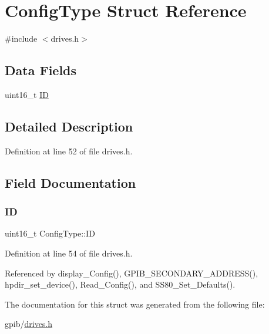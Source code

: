 \hypertarget{structConfigType}{}\section{Config\+Type Struct Reference}
\label{structConfigType}


{\ttfamily \#include $<$drives.\+h$>$}

\subsection*{Data Fields}
\begin{DoxyCompactItemize}
\item 
uint16\+\_\+t \hyperlink{structConfigType_a7d89346361dc0f06db0917c7ff37501a}{ID}
\end{DoxyCompactItemize}


\subsection{Detailed Description}


Definition at line 52 of file drives.\+h.



\subsection{Field Documentation}
\mbox{\label{structConfigType_a7d89346361dc0f06db0917c7ff37501a}} 
\subsubsection{\texorpdfstring{ID}{ID}}
{\footnotesize\ttfamily uint16\+\_\+t Config\+Type\+::\+ID}



Definition at line 54 of file drives.\+h.



Referenced by display\+\_\+\+Config(), G\+P\+I\+B\+\_\+\+S\+E\+C\+O\+N\+D\+A\+R\+Y\+\_\+\+A\+D\+D\+R\+E\+S\+S(), hpdir\+\_\+set\+\_\+device(), Read\+\_\+\+Config(), and S\+S80\+\_\+\+Set\+\_\+\+Defaults().



The documentation for this struct was generated from the following file\+:\begin{DoxyCompactItemize}
\item 
gpib/\hyperlink{drives_8h}{drives.\+h}\end{DoxyCompactItemize}
